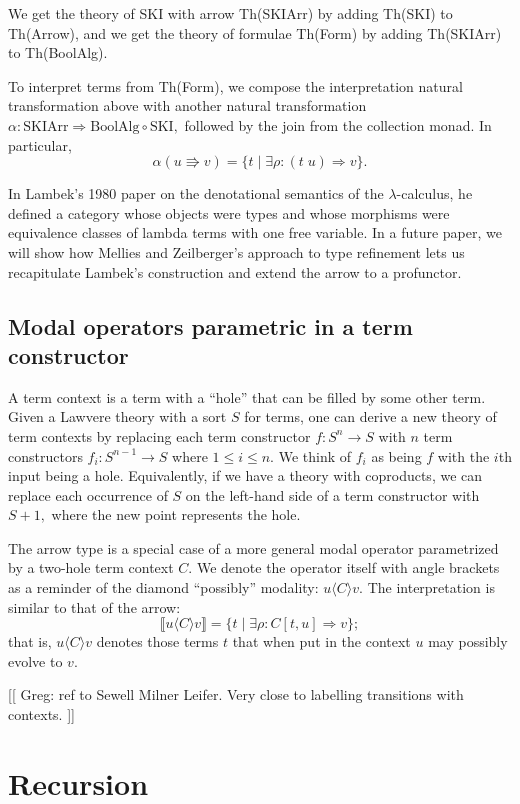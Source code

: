 \documentclass{llncs}
\newcommand{\interp}[1]{\llbracket #1 \rrbracket}
\newcommand{\maps}{\colon}
\begin{document}
We get the theory of SKI with arrow Th(SKIArr) by adding Th(SKI) to Th(Arrow), and we get the theory of formulae Th(Form) by adding Th(SKIArr) to Th(BoolAlg).

To interpret terms from Th(Form), we compose the interpretation natural transformation above with another natural transformation $\alpha\maps \mathrm{SKIArr} \Rightarrow \mathrm{BoolAlg} \circ \mathrm{SKI},$ followed by the join from the collection monad.  In particular, 
\[ \alpha(u \Rrightarrow v) = \{ t \;|\; \exists \rho\maps (t\; u) \Rightarrow v \}. \]

In Lambek's 1980 paper \cite{Lambek} on the denotational semantics of the $\lambda$-calculus, he defined a category whose objects were types and whose morphisms were equivalence classes of lambda terms with one free variable.  In a future paper, we will show how Mellies and Zeilberger's approach to type refinement lets us recapitulate Lambek's construction and extend the arrow to a profunctor.

\subsection{Modal operators parametric in a term constructor}

A term context is a term with a ``hole'' that can be filled by some other term.  Given a Lawvere theory with a sort $S$ for terms, one can derive a new theory of term contexts by replacing each term constructor $f\maps S^n \to S$ with $n$ term constructors $f_i\maps S^{n-1} \to S$ where $1 \le i \le n$.  We think of $f_i$ as being $f$ with the $i$th input being a hole.  Equivalently, if we have a theory with coproducts, we can replace each occurrence of $S$ on the left-hand side of a term constructor with $S+1,$ where the new point represents the hole.

The arrow type is a special case of a more general modal operator parametrized by a two-hole term context $C.$  We denote the operator itself with angle brackets as a reminder of the diamond ``possibly'' modality: $u \langle C \rangle v.$  The interpretation is similar to that of the arrow:
\[ \interp{u \langle C\rangle v} = \{ t \;|\; \exists \rho\maps C[t, u] \Rightarrow v \}; \]
that is, $u \langle C\rangle v$ denotes those terms $t$ that when put in the context $u$ may possibly evolve to $v.$

[[ Greg: ref to Sewell Milner Leifer.  Very close to labelling transitions with contexts. ]]

\section{Recursion}
\end{document}

